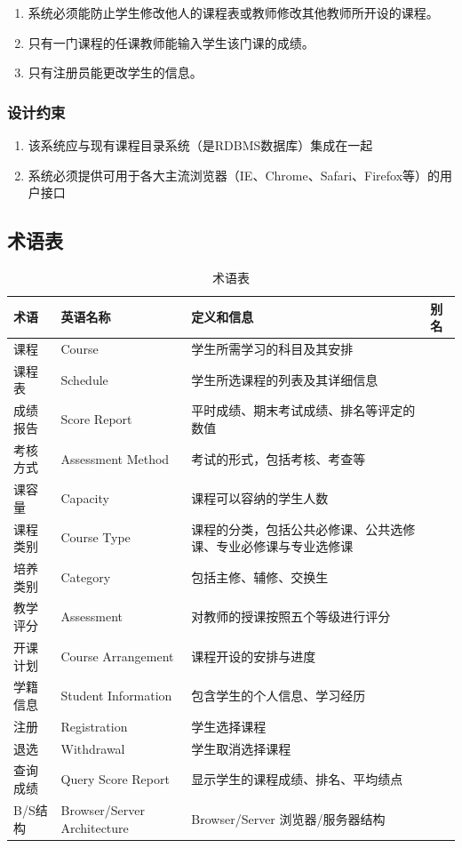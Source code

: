   \begin{enumerate}
    \item 系统必须能防止学生修改他人的课程表或教师修改其他教师所开设的课程。
    \item 只有一门课程的任课教师能输入学生该门课的成绩。
    \item 只有注册员能更改学生的信息。
  \end{enumerate}
  
\subsubsection{设计约束}
  
  \begin{enumerate}
    \item 该系统应与现有课程目录系统（是RDBMS数据库）集成在一起
    \item 系统必须提供可用于各大主流浏览器（IE、Chrome、Safari、Firefox等）的用户接口
  \end{enumerate}

\subsection{术语表}
  \begin{table}[H]
    \caption{术语表}
    \begin{tabularx}{\textwidth}{|l|l|X|l|}
    \hline
    \textbf{术语} & \textbf{英语名称} & \textbf{定义和信息} & \textbf{别名}\\
    \hline
    课程&Course&学生所需学习的科目及其安排&\\
    \hline
    课程表&Schedule&学生所选课程的列表及其详细信息&\\
    \hline
    成绩报告&Score Report&平时成绩、期末考试成绩、排名等评定的数值&\\
    \hline
    考核方式&Assessment Method&考试的形式，包括考核、考查等&\\
    \hline
    课容量&Capacity&课程可以容纳的学生人数&\\
    \hline
    课程类别&Course Type&课程的分类，包括公共必修课、公共选修课、专业必修课与专业选修课&\\
    \hline
    培养类别&Category&包括主修、辅修、交换生&\\
    \hline
    教学评分&Assessment&对教师的授课按照五个等级进行评分\\
    \hline
    开课计划&Course Arrangement&课程开设的安排与进度&\\
    \hline
    学籍信息&Student Information&包含学生的个人信息、学习经历&\\
    \hline
    注册&Registration&学生选择课程&\\
    \hline
    退选&Withdrawal&学生取消选择课程&\\
    \hline
    查询成绩&Query Score Report&显示学生的课程成绩、排名、平均绩点&\\
    \hline
    B/S结构&Browser/Server Architecture&Browser/Server 浏览器/服务器结构&\\
    \hline
  \end{tabularx}
  
\end{table}


